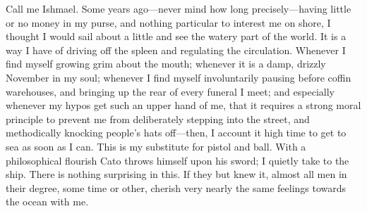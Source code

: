 \documentclass[10pt]{article} %
\begin{document}
Call me Ishmael. Some years ago---never mind how long precisely---having little or no money in my purse, and nothing particular to interest me on shore, I thought I would sail about a little and see the watery part of the world. It is a way I have of driving off the spleen and regulating the circulation. Whenever I find myself growing grim about the mouth; whenever it is a damp, drizzly November in my soul; whenever I find myself involuntarily pausing before coffin warehouses, and bringing up the rear of every funeral I meet; and especially whenever my hypos get such an upper hand of me, that it requires a strong moral principle to prevent me from deliberately stepping into the street, and methodically knocking people's hats off---then, I account it high time to get to sea as soon as I can. This is my substitute for pistol and ball. With a philosophical flourish Cato throws himself upon his sword; I quietly take to the ship. There is nothing surprising in this. If they but knew it, almost all men in their degree, some time or other, cherish very nearly the same feelings towards the ocean with me.




















\begin{comment}
\newpage
\addcontentsline{toc}{section}{References}
\printbibliography
\end{comment}

\end{document}
